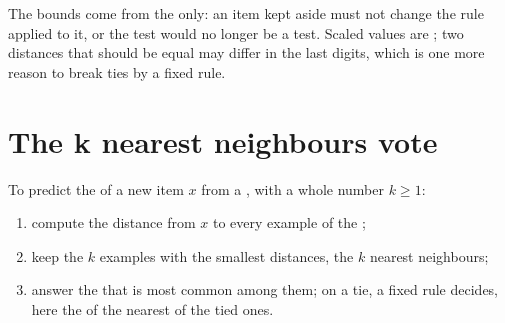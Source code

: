\label{out:g11:k-nearest-neighbours:scale}

The bounds come from the  only: an item kept aside must not change the rule applied to it, or the test
would no longer be a test. Scaled values are ; two distances that should be equal may differ in
the last digits, which is one more reason to break ties by a fixed rule.

\section{The k nearest neighbours vote}\label{sec:g11:k-nearest-neighbours:vote}

\begin{method}\label{met:g11:k-nearest-neighbours:knn}
To predict the  of a new item $x$ from a , with a whole number $k \ge 1$:
\begin{enumerate}
  \item compute the distance from $x$ to every example of the ;
  \item keep the $k$ examples with the smallest distances, the $k$ nearest neighbours;
  \item answer the  that is most common among them; on a tie, a fixed rule decides, here the  of the
    nearest of the tied ones.
\end{enumerate}
\end{method}

\label{lst:g11:k-nearest-neighbours:knn}

\label{out:g11:k-nearest-neighbours:knn}

